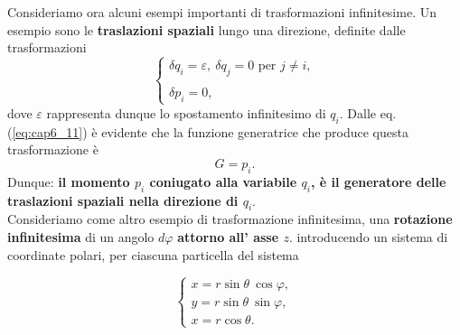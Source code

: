 \documentclass[a4paper,12pt,oneside]{book}
\begin{document}
Consideriamo ora alcuni esempi importanti di trasformazioni infinitesime. Un esempio sono le \textbf{traslazioni spaziali} lungo una direzione, definite dalle trasformazioni
\begin{equation}
\begin{cases}
\displaystyle{\delta q_i = \varepsilon, \  \delta q_j =0 \textrm{ per } j\neq i, }\\
\\
\displaystyle{\delta p_i = 0,}
\end{cases}
\end{equation}
dove $\varepsilon$ rappresenta dunque lo spostamento infinitesimo di $q_i$. Dalle eq. (\ref{eq:cap6_11}) è evidente che la funzione generatrice che produce questa trasformazione è
\begin{equation}
G=p_i .
\end{equation}
Dunque: \textbf{il momento $p_i$ coniugato alla variabile $q_i$, è il generatore delle traslazioni spaziali nella direzione di $q_i$}.\\
Consideriamo come altro esempio di trasformazione infinitesima, una \textbf{rotazione infinitesima} di un angolo $d\varphi$ \textbf{attorno all' asse $z$}. introducendo un sistema di coordinate polari, per ciascuna particella del sistema 
\begin{center}
\begin{minipage}{0.50\textwidth}
\centering
{}
%
%
\end{minipage}
\begin{minipage}[c]{0.4\textwidth}
\centering
\begin{equation}
\begin{cases} 
x= r \sin \theta \ \cos \varphi , \\
y= r \sin \theta \ \sin \varphi  ,\\
x= r \cos \theta .
\end{cases}
\end{equation}
\end{minipage}
\end{center}
\end{document}
